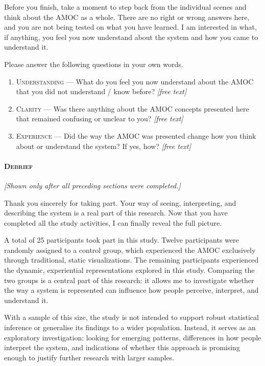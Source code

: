 Before you finish, take a moment to step back from the individual scenes and think about the
AMOC as a whole. There are no right or wrong answers here, and you are not being tested on
what you have learned. I am interested in what, if anything, you feel you now understand about
the system and how you came to understand it.

Please answer the following questions in your own words.

\begin{enumerate}[leftmargin=2.4em, itemsep=3pt, start=19]
\item \textsc{Understanding} --- What do you feel you now understand about the AMOC that you
      did not understand / know before? \emph{[free text]}
\item \textsc{Clarity} --- Was there anything about the AMOC concepts presented here that
      remained confusing or unclear to you? \emph{[free text]}
\item \textsc{Experience} --- Did the way the AMOC was presented change how you think about or
      understand the system? If yes, how? \emph{[free text]}
\end{enumerate}

\paragraph{\textsc{Debrief}}
\emph{[Shown only after all preceding sections were completed.]}

Thank you sincerely for taking part. Your way of seeing, interpreting, and describing the
system is a real part of this research. Now that you have completed all the study activities,
I can finally reveal the full picture.

A total of 25 participants took part in this study. Twelve participants were randomly assigned
to a control group, which experienced the AMOC exclusively through traditional, static
visualizations. The remaining participants experienced the dynamic, experiential
representations explored in this study. Comparing the two groups is a central part of this
research: it allows me to investigate whether the way a system is represented can influence how
people perceive, interpret, and understand it.

With a sample of this size, the study is not intended to support robust statistical inference
or generalise its findings to a wider population. Instead, it serves as an exploratory
investigation: looking for emerging patterns, differences in how people interpret the system,
and indications of whether this approach is promising enough to justify further research with
larger samples.

